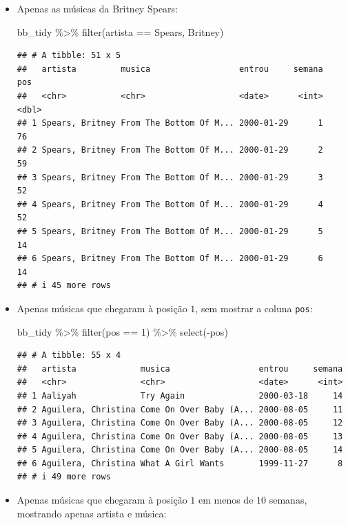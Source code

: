 \documentclass[
  11pt]{report}
\newenvironment{Shaded}{\begin{snugshade}}{\end{snugshade}}
\newcommand{\DecValTok}[1]{\textcolor[rgb]{0.00,0.00,0.81}{#1}}
\newcommand{\FunctionTok}[1]{\textcolor[rgb]{0.00,0.00,0.00}{#1}}
\newcommand{\NormalTok}[1]{#1}
\newcommand{\SpecialCharTok}[1]{\textcolor[rgb]{0.00,0.00,0.00}{#1}}
\newcommand{\StringTok}[1]{\textcolor[rgb]{0.31,0.60,0.02}{#1}}
\renewenvironment{Shaded}{
    \begin{mdframed}[%
      roundcorner=2pt,%
      innerleftmargin=5pt,%
      innerrightmargin=5pt,%
      topline=true,%
      leftline=true,%
      rightline=true,%
      bottomline=true,%
      linewidth=0.5pt,%
      linecolor=black!20,%
      backgroundcolor=black!2,%
      skipabove=2ex,%
      skipbelow=2.5ex%
    ]%
  }
  {
    \end{mdframed}
  }
\begin{document}
\begin{itemize}
\item
  Apenas as músicas da Britney Spears:

\begin{Shaded}
\begin{Highlighting}[]
\NormalTok{bb\_tidy }\SpecialCharTok{\%\textgreater{}\%} 
  \FunctionTok{filter}\NormalTok{(artista }\SpecialCharTok{==} \StringTok{\textquotesingle{}Spears, Britney\textquotesingle{}}\NormalTok{)}
\end{Highlighting}
\end{Shaded}

\begin{verbatim}
## # A tibble: 51 x 5
##   artista         musica                  entrou     semana   pos
##   <chr>           <chr>                   <date>      <int> <dbl>
## 1 Spears, Britney From The Bottom Of M... 2000-01-29      1    76
## 2 Spears, Britney From The Bottom Of M... 2000-01-29      2    59
## 3 Spears, Britney From The Bottom Of M... 2000-01-29      3    52
## 4 Spears, Britney From The Bottom Of M... 2000-01-29      4    52
## 5 Spears, Britney From The Bottom Of M... 2000-01-29      5    14
## 6 Spears, Britney From The Bottom Of M... 2000-01-29      6    14
## # i 45 more rows
\end{verbatim}
\item
  Apenas músicas que chegaram à posição $1$, sem mostrar a coluna \texttt{pos}:

\begin{Shaded}
\begin{Highlighting}[]
\NormalTok{bb\_tidy }\SpecialCharTok{\%\textgreater{}\%} 
  \FunctionTok{filter}\NormalTok{(pos }\SpecialCharTok{==} \DecValTok{1}\NormalTok{) }\SpecialCharTok{\%\textgreater{}\%} 
  \FunctionTok{select}\NormalTok{(}\SpecialCharTok{{-}}\NormalTok{pos)}
\end{Highlighting}
\end{Shaded}

\begin{verbatim}
## # A tibble: 55 x 4
##   artista             musica                  entrou     semana
##   <chr>               <chr>                   <date>      <int>
## 1 Aaliyah             Try Again               2000-03-18     14
## 2 Aguilera, Christina Come On Over Baby (A... 2000-08-05     11
## 3 Aguilera, Christina Come On Over Baby (A... 2000-08-05     12
## 4 Aguilera, Christina Come On Over Baby (A... 2000-08-05     13
## 5 Aguilera, Christina Come On Over Baby (A... 2000-08-05     14
## 6 Aguilera, Christina What A Girl Wants       1999-11-27      8
## # i 49 more rows
\end{verbatim}
\item
  Apenas músicas que chegaram à posição $1$ em menos de $10$ semanas, mostrando apenas artista e música:


\end{itemize}
\end{document}
